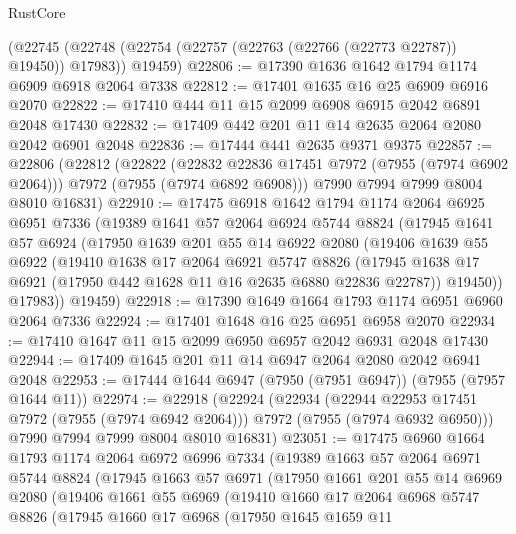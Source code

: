 \begin{lexlean}{RustCore}
\begin{coremodule}
    (@22745 (@22748 (@22754 (@22757 (@22763 (@22766 (@22773 @22787)) @19450)) @17983)) @19459)
@22806 := @17390 @1636 @1642 @1794 @1174 @6909 @6918 @2064 @7338
@22812 := @17401 @1635 @16 @25 @6909 @6916 @2070
@22822 := @17410 @444 @11 @15 @2099 @6908 @6915 @2042 @6891 @2048 @17430
@22832 := @17409 @442 @201 @11 @14 @2635 @2064 @2080 @2042 @6901 @2048
@22836 := @17444 @441 @2635 @9371 @9375
@22857 := @22806
    (@22812
      (@22822
        (@22832 @22836 @17451 @7972 (@7955 (@7974 @6902 @2064)))
        @7972
        (@7955 (@7974 @6892 @6908)))
      @7990
      @7994
      @7999
      @8004
      @8010
      @16831)
@22910 := @17475
    @6918
    @1642
    @1794
    @1174
    @2064
    @6925
    @6951
    @7336
    (@19389
      @1641
      @57
      @2064
      @6924
      @5744
      @8824
      (@17945
        @1641
        @57
        @6924
        (@17950
          @1639
          @201
          @55
          @14
          @6922
          @2080
          (@19406
            @1639
            @55
            @6922
            (@19410
              @1638
              @17
              @2064
              @6921
              @5747
              @8826
              (@17945 @1638 @17 @6921 (@17950 @442 @1628 @11 @16 @2635 @6880 @22836 @22787))
              @19450))
          @17983))
      @19459)
@22918 := @17390 @1649 @1664 @1793 @1174 @6951 @6960 @2064 @7336
@22924 := @17401 @1648 @16 @25 @6951 @6958 @2070
@22934 := @17410 @1647 @11 @15 @2099 @6950 @6957 @2042 @6931 @2048 @17430
@22944 := @17409 @1645 @201 @11 @14 @6947 @2064 @2080 @2042 @6941 @2048
@22953 := @17444 @1644 @6947 (@7950 (@7951 @6947)) (@7955 (@7957 @1644 @11))
@22974 := @22918
    (@22924
      (@22934
        (@22944 @22953 @17451 @7972 (@7955 (@7974 @6942 @2064)))
        @7972
        (@7955 (@7974 @6932 @6950)))
      @7990
      @7994
      @7999
      @8004
      @8010
      @16831)
@23051 := @17475
    @6960
    @1664
    @1793
    @1174
    @2064
    @6972
    @6996
    @7334
    (@19389
      @1663
      @57
      @2064
      @6971
      @5744
      @8824
      (@17945
        @1663
        @57
        @6971
        (@17950
          @1661
          @201
          @55
          @14
          @6969
          @2080
          (@19406
            @1661
            @55
            @6969
            (@19410
              @1660
              @17
              @2064
              @6968
              @5747
              @8826
              (@17945
                @1660
                @17
                @6968
                (@17950
                  @1645
                  @1659
                  @11

\end{coremodule}
\end{lexlean}
